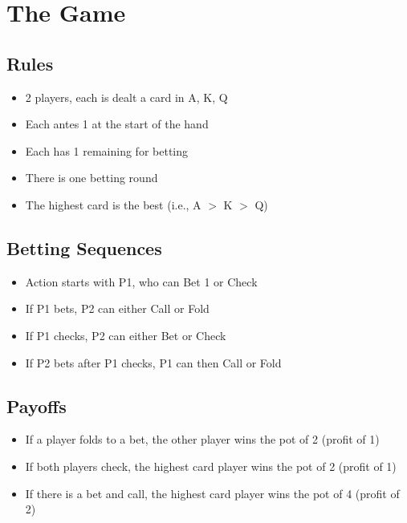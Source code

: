 \documentclass[12pt]{article}
\begin{document}
\maketitle


\section{The Game}

\subsection{Rules}
\begin{itemize}
\item 2 players, each is dealt a card in {A, K, Q}
\item Each antes 1 at the start of the hand
\item Each has 1 remaining for betting
\item There is one betting round
\item The highest card is the best (i.e., A $>$ K $>$ Q)
\end{itemize}

\subsection{Betting Sequences}
\begin{itemize}
\item Action starts with P1, who can Bet 1 or Check
\item If P1 bets, P2 can either Call or Fold
\item If P1 checks, P2 can either Bet or Check
\item If P2 bets after P1 checks, P1 can then Call or Fold
\end{itemize}

\subsection{Payoffs}
\begin{itemize}
\item If a player folds to a bet, the other player wins the pot of 2 (profit of 1)
\item If both players check, the highest card player wins the pot of 2 (profit of 1)
\item If there is a bet and call, the highest card player wins the pot of 4 (profit of 2)
\end{itemize}
\end{document}
